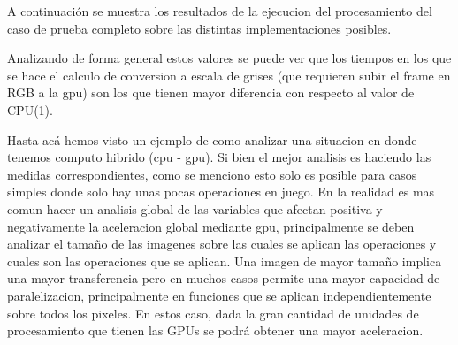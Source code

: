 \documentclass[a4paper,10pt]{report}
\begin{document}
A continuación se muestra los resultados de la ejecucion del procesamiento del caso de prueba completo sobre las distintas implementaciones posibles.

\begin{center}
\end{center}





Analizando de forma general estos valores se puede ver que los tiempos en los que se hace el calculo de conversion a escala de grises (que requieren subir el frame en RGB a la gpu) son los que tienen mayor
diferencia con respecto al valor de CPU(1).



Hasta acá hemos visto un ejemplo de como analizar una situacion en donde tenemos computo hibrido (cpu - gpu).
Si bien el mejor analisis es haciendo las medidas correspondientes, como se menciono esto solo es posible para casos simples donde solo hay unas pocas operaciones en juego.
En la realidad es mas comun hacer un analisis global de las variables que afectan positiva y negativamente la aceleracion global mediante gpu, principalmente se deben analizar el tamaño de las imagenes 
sobre las cuales se aplican las operaciones y cuales son las operaciones que se aplican. Una imagen de mayor tamaño implica una mayor transferencia pero en muchos casos permite una mayor capacidad de paralelizacion, 
principalmente en funciones que se aplican independientemente sobre todos los pixeles. En estos caso, dada la gran cantidad de unidades de procesamiento que tienen las GPUs se podrá obtener una mayor aceleracion.
\end{document}
